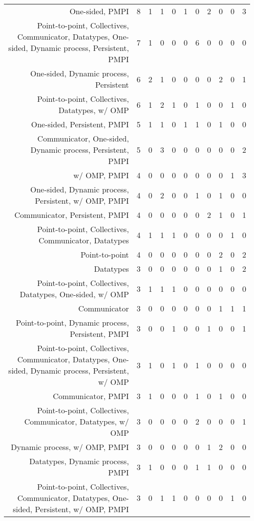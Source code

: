{\begin{landscape}
\begin{longtable}[htb]{r|c|c|c|c|c|c|c|c|c|c}
{One-sided, PMPI} & 8 & 1 & 1 & 0 & 1 & 0 & 2 & 0 & 0 & 3 \\%
{Point-to-point, Collectives, Communicator, Datatypes, One-sided, Dynamic process, Persistent, PMPI} & 7 & 1 & 0 & 0 & 0 & 6 & 0 & 0 & 0 & 0 \\%
{One-sided, Dynamic process, Persistent} & 6 & 2 & 1 & 0 & 0 & 0 & 0 & 2 & 0 & 1 \\%
{Point-to-point, Collectives, Datatypes, w/ OMP} & 6 & 1 & 2 & 1 & 0 & 1 & 0 & 0 & 1 & 0 \\%
{One-sided, Persistent, PMPI} & 5 & 1 & 1 & 0 & 1 & 1 & 0 & 1 & 0 & 0 \\%
{Communicator, One-sided, Dynamic process, Persistent, PMPI} & 5 & 0 & 3 & 0 & 0 & 0 & 0 & 0 & 0 & 2 \\%
{w/ OMP, PMPI} & 4 & 0 & 0 & 0 & 0 & 0 & 0 & 0 & 1 & 3 \\%
{One-sided, Dynamic process, Persistent, w/ OMP, PMPI} & 4 & 0 & 2 & 0 & 0 & 1 & 0 & 1 & 0 & 0 \\%
{Communicator, Persistent, PMPI} & 4 & 0 & 0 & 0 & 0 & 0 & 2 & 1 & 0 & 1 \\%
{Point-to-point, Collectives, Communicator, Datatypes} & 4 & 1 & 1 & 1 & 0 & 0 & 0 & 0 & 1 & 0 \\%
{Point-to-point} & 4 & 0 & 0 & 0 & 0 & 0 & 0 & 2 & 0 & 2 \\%
{Datatypes} & 3 & 0 & 0 & 0 & 0 & 0 & 0 & 1 & 0 & 2 \\%
{Point-to-point, Collectives, Datatypes, One-sided, w/ OMP} & 3 & 1 & 1 & 1 & 0 & 0 & 0 & 0 & 0 & 0 \\%
{Communicator} & 3 & 0 & 0 & 0 & 0 & 0 & 0 & 1 & 1 & 1 \\%
{Point-to-point, Dynamic process, Persistent, PMPI} & 3 & 0 & 0 & 1 & 0 & 0 & 1 & 0 & 0 & 1 \\%
{Point-to-point, Collectives, Communicator, Datatypes, One-sided, Dynamic process, Persistent, w/ OMP} & 3 & 1 & 0 & 1 & 0 & 1 & 0 & 0 & 0 & 0 \\%
{Communicator, PMPI} & 3 & 1 & 0 & 0 & 0 & 1 & 0 & 1 & 0 & 0 \\%
{Point-to-point, Collectives, Communicator, Datatypes, w/ OMP} & 3 & 0 & 0 & 0 & 0 & 2 & 0 & 0 & 0 & 1 \\%
{Dynamic process, w/ OMP, PMPI} & 3 & 0 & 0 & 0 & 0 & 0 & 1 & 2 & 0 & 0 \\%
{Datatypes, Dynamic process, PMPI} & 3 & 1 & 0 & 0 & 0 & 1 & 1 & 0 & 0 & 0 \\%
{Point-to-point, Collectives, Communicator, Datatypes, One-sided, Persistent, w/ OMP, PMPI} & 3 & 0 & 1 & 1 & 0 & 0 & 0 & 0 & 1 & 0 \\%

\end{longtable}
\end{landscape}}
